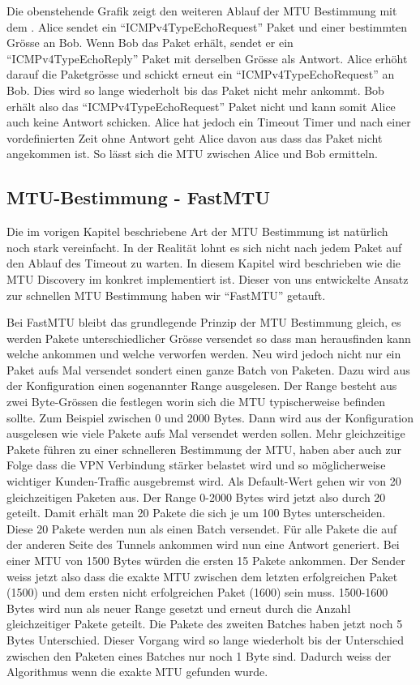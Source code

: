 Die obenstehende Grafik zeigt den weiteren Ablauf der \acs{MTU} Bestimmung mit dem \tool{}. Alice sendet ein \enquote{ICMPv4TypeEchoRequest} Paket und einer bestimmten Grösse an Bob. Wenn Bob das Paket erhält, sendet er ein \enquote{ICMPv4TypeEchoReply} Paket mit derselben Grösse als Antwort. Alice erhöht darauf die Paketgrösse und schickt erneut ein \enquote{ICMPv4TypeEchoRequest} an Bob. Dies wird so lange wiederholt bis das Paket nicht mehr ankommt. Bob erhält also das \enquote{ICMPv4TypeEchoRequest} Paket nicht und kann somit Alice auch keine Antwort schicken. Alice hat jedoch ein Timeout Timer und nach einer vordefinierten Zeit ohne Antwort geht Alice davon aus dass das Paket nicht angekommen ist. So lässt sich die \acs{MTU} zwischen Alice und Bob ermitteln.

\subsection{MTU-Bestimmung - FastMTU}
Die im vorigen Kapitel beschriebene Art der \acs{MTU} Bestimmung ist natürlich noch stark vereinfacht. In der Realität lohnt es sich nicht nach jedem Paket auf den Ablauf des Timeout zu warten. In diesem Kapitel wird beschrieben wie die MTU Discovery im \tool konkret implementiert ist. Dieser von uns entwickelte Ansatz zur schnellen MTU Bestimmung haben wir \enquote{FastMTU} getauft.

Bei FastMTU bleibt das grundlegende Prinzip der \acs{MTU} Bestimmung gleich, es werden Pakete unterschiedlicher Grösse versendet so dass man herausfinden kann welche ankommen und welche verworfen werden. Neu wird jedoch nicht nur ein Paket aufs Mal versendet sondert einen ganze Batch von Paketen. Dazu wird aus der Konfiguration einen sogenannter Range ausgelesen. Der Range besteht aus zwei Byte-Grössen die festlegen worin sich die \acs{MTU} typischerweise befinden sollte. Zum Beispiel zwischen 0 und 2000 Bytes. Dann wird aus der Konfiguration ausgelesen wie viele Pakete aufs Mal versendet werden sollen. Mehr gleichzeitige Pakete führen zu einer schnelleren Bestimmung der \acs{MTU}, haben aber auch zur Folge dass die \acs{VPN} Verbindung stärker belastet wird und so möglicherweise wichtiger Kunden-Traffic ausgebremst wird. Als Default-Wert gehen wir von 20 gleichzeitigen Paketen aus. Der Range 0-2000 Bytes wird jetzt also durch 20 geteilt. Damit erhält man 20 Pakete die sich je um 100 Bytes unterscheiden. Diese 20 Pakete werden nun als einen Batch versendet.
Für alle Pakete die auf der anderen Seite des Tunnels ankommen wird nun eine Antwort generiert. Bei einer MTU von 1500 Bytes würden die ersten 15 Pakete ankommen. Der Sender weiss jetzt also dass die exakte \acs{MTU} zwischen dem letzten erfolgreichen Paket (1500) und dem ersten nicht erfolgreichen Paket (1600) sein muss. 1500-1600 Bytes wird nun als neuer Range gesetzt und erneut durch die Anzahl gleichzeitiger Pakete geteilt. Die Pakete des zweiten Batches haben jetzt noch 5 Bytes Unterschied. Dieser Vorgang wird so lange wiederholt bis der Unterschied zwischen den Paketen eines Batches nur noch 1 Byte sind. Dadurch weiss der Algorithmus wenn die exakte \acs{MTU} gefunden wurde.


